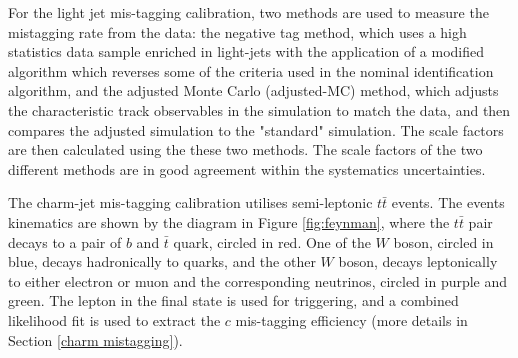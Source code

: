 \documentclass[letterpaper,12pt]{article}
\begin{document}
For the light jet mis-tagging calibration, two methods are 
used to measure the mistagging rate from the data: the negative 
tag method, which uses a high statistics data sample enriched 
in light-jets with the application of a modified algorithm which 
reverses some of the criteria used in the nominal identification 
algorithm, and the adjusted Monte Carlo (adjusted-MC) method, which 
adjusts the characteristic track observables in the simulation 
to match the data, and then compares the adjusted simulation to the 
"standard" simulation. The scale factors are then calculated using 
the these two methods. The scale factors of the two different methods 
are in good agreement within the systematics uncertainties\cite{ATLAS-CONF-2018-006}. 

The charm-jet mis-tagging calibration utilises semi-leptonic $t\bar{t}$ 
events. The events kinematics are shown by the diagram in 
Figure \ref{fig:feynman}, where the $t\bar{t}$ pair decays to a 
pair of $b$ and $\bar{t}$ quark, circled in red. One of the $W$ boson, 
circled in blue, decays hadronically to quarks, and the other $W$ boson, 
decays leptonically to either electron or muon and the corresponding neutrinos, 
circled in purple and green. The lepton in the final state is used for 
triggering, and a combined likelihood fit is used to extract the $c$ mis-tagging 
efficiency (more details in Section \ref{charm mistagging}). 
\end{document}
